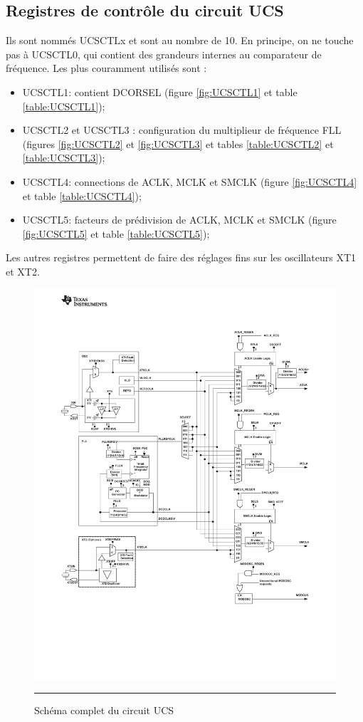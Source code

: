 \subsection{Registres de contrôle du circuit UCS}
Ils sont nommés UCSCTLx et sont au nombre de 10. En principe, on ne touche pas à UCSCTL0, qui contient des grandeurs internes au comparateur de fréquence. Les plus couramment utilisés sont :
\begin{itemize}[label=\textbullet,font=\small]
\item UCSCTL1: contient DCORSEL (figure \ref{fig:UCSCTL1} et table \ref{table:UCSCTL1});
\item UCSCTL2 et UCSCTL3 : configuration du multiplieur de fréquence FLL (figures \ref{fig:UCSCTL2} et \ref{fig:UCSCTL3} et tables \ref{table:UCSCTL2} et \ref{table:UCSCTL3}); 
\item UCSCTL4: connections de ACLK, MCLK et SMCLK (figure \ref{fig:UCSCTL4} et table \ref{table:UCSCTL4});
\item UCSCTL5: facteurs de prédivision de ACLK, MCLK et SMCLK (figure \ref{fig:UCSCTL5} et table \ref{table:UCSCTL5});
\end{itemize}
Les autres registres permettent de faire des réglages fins sur les oscillateurs XT1 et XT2.

\begin{figure}[H]
  \centering
  \includegraphics [angle=0, width=16cm]{./Figures/Chap6_Horloges/UCS_Schema.pdf}
  \rule{35em}{0.5pt}
  \caption{Schéma complet du circuit UCS}
  \label{fig:UCS_Schema}
\end{figure}

